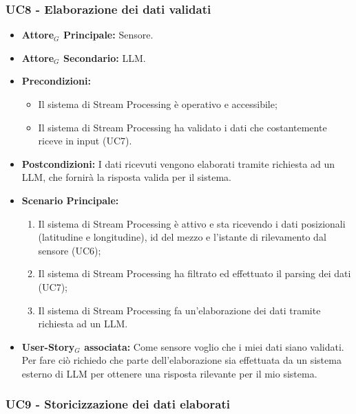 \documentclass[11pt]{article}
\begin{document}
\begin{justify}

\subsubsection{\textbf{UC8 - Elaborazione dei dati validati}}

\label{UC8}
\begin{itemize}
    \item \textbf{Attore$_G$ Principale:} Sensore.
    \item \textbf{Attore$_G$ Secondario:} LLM.
    \item \textbf{Precondizioni:} 
        \begin{itemize}
          \item Il sistema di Stream Processing è operativo e accessibile;
            \item Il sistema di Stream Processing ha validato i dati che costantemente riceve in input (UC7).
        \end{itemize}
      \item \textbf{Postcondizioni:} I dati ricevuti vengono elaborati tramite richiesta ad un LLM, che fornirà la risposta valida per il sistema.
    \item \textbf{Scenario Principale:} 
        \begin{enumerate}
        \item Il sistema di Stream Processing è attivo e sta ricevendo i dati posizionali (latitudine e longitudine), id del mezzo e l'istante di rilevamento dal sensore (UC6);
        \item Il sistema di Stream Processing ha filtrato ed effettuato il parsing dei dati (UC7);
        \item Il sistema di Stream Processing fa un'elaborazione dei dati tramite richiesta ad un LLM.
        \end{enumerate}
    \item \textbf{User-Story$_G$ associata:} Come sensore voglio che i miei dati siano validati. Per fare ciò richiedo che parte dell'elaborazione sia effettuata da un sistema esterno di LLM per ottenere una risposta rilevante per il mio sistema.
\end{itemize}


\subsubsection{\textbf{UC9 - Storicizzazione dei dati elaborati}}


\end{justify}
\end{document}
